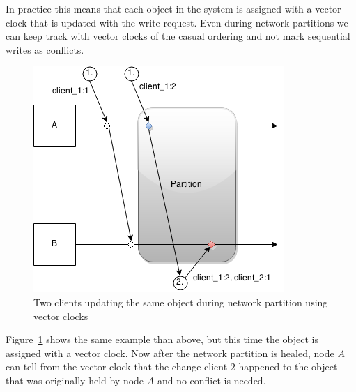 In practice this means that each object in the system is assigned with a vector
clock that is updated with the write request. Even during network partitions we
can keep track with vector clocks of the casual ordering and not mark sequential
writes as conflicts.

\begin{figure}[h!]
  \centering
    \includegraphics[scale=0.7]{pictures/apexample_clocks.png}
  \caption{Two clients updating the same object during network partition using
  vector clocks}
\label{ap-example-clocks}
\end{figure}

Figure~\ref{ap-example-clocks} shows the same example than above, but this time
the object is assigned with a vector clock. Now after the network partition is
healed, node \(A\) can tell from the vector clock that the change client \(2\)
happened to the object that was originally held by node \(A\) and no conflict is
needed.

